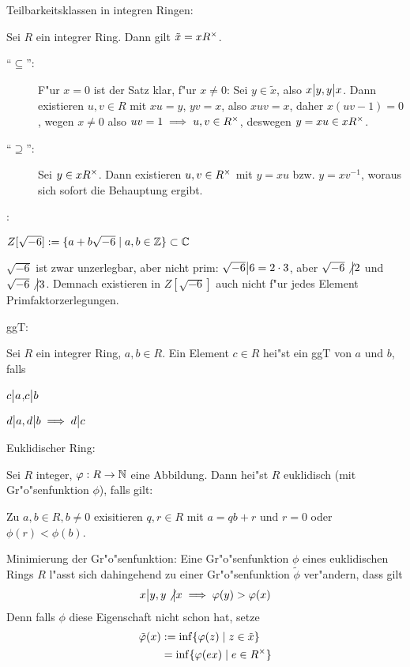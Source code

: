 \remark Teilbarkeitsklassen in integren Ringen:{
  Sei $R$ ein integrer Ring. Dann gilt $\tilde x=xR^\times$.
  \begin{description}
    \item[``$\subseteq$'':] F"ur $x=0$ ist der Satz klar, f"ur $x\ne0$: 
      Sei $y\in \tilde x$, also $x\big| y,y\big| x$.
      Dann existieren $u,v\in R$ mit $xu=y$, $yv=x$, also $xuv=x$, 
      daher $x(uv-1)=0$, wegen $x\ne 0$ also $uv=1\implies u,v\in R^\times$,
      deswegen $y=xu\in xR^\times$.
    \item[``$\supseteq$'':] Sei $y\in xR^\times$. Dann existieren 
      $u,v\in R^\times$ mit $y=xu$ bzw. $y=xv^{-1}$, woraus sich
      sofort die Behauptung ergibt.
    \end{description}
  }
\example:{
  $Z[\sqrt{-6}]:=\{a+b\sqrt{-6}\mid a,b\in\mathbb Z\}\subset\mathbb C$
  
  $\sqrt{-6}$ ist zwar unzerlegbar, aber nicht prim: 
  $\sqrt{-6}\big| 6=2\cdot 3$, aber
  $\sqrt{-6}\not\big| 2$ und $\sqrt{-6}\not\big| 3$. Demnach existieren in 
  $Z[\sqrt{-6}]$ auch nicht f"ur jedes Element Primfaktorzerlegungen.
  }
 ggT:{
  Sei $R$ ein integrer Ring, $a,b\in R$. Ein Element $c\in R$ hei"st ein
  ggT von $a$ und $b$, falls
  \begin{stmts}
    \item $c\big| a$,$c\big| b$
    \item $d\big| a,d\big| b\implies d\big| c$
    \end{stmts}
  }
 Euklidischer Ring:{
  Sei $R$ integer, $\varphi:R\to\mathbb N$ eine Abbildung. Dann hei"st $R$ euklidisch
  (mit Gr"o"senfunktion $\phi$), falls gilt:
  
  Zu $a,b\in R,b\ne 0$ exisitieren $q,r\in R$ mit $a=qb+r$ und $r=0$ oder 
  $\phi(r)<\phi(b)$.
  }
\remark Minimierung der Gr"o"senfunktion:{
  Eine Gr"o"senfunktion $\phi$ eines euklidischen Rings $R$ l"asst sich 
  dahingehend zu einer Gr"o"senfunktion $\tilde\phi$ ver"andern, dass gilt
  \[x\big| y,y\not\big| x\implies \varphi(y)>\varphi(x)
    \]
  Denn falls $\phi$ diese Eigenschaft nicht schon hat, setze
  \begin{align*}
    \tilde{\varphi}(x)&:=\inf\{\varphi(z)\mid z\in\tilde x\} \\
      &=\inf\{\varphi(ex)\mid e\in R^\times\}
    \end{align*}
  }
